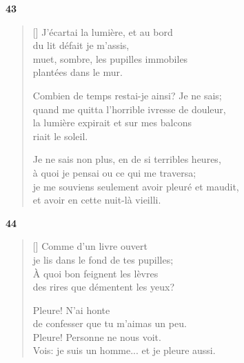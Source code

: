 \documentclass[a4paper,12pt]{book}
\begin{document}
\bigskip

\begin{center}
  \textbf{43}
   \end{center}

\settowidth{\versewidth}{je me souviens seulement avoir pleuré et maudit,}

\begin{verse}[\versewidth]
  J'écartai la lumière, et au bord \\
  du lit défait je m'assis, \\
  muet, sombre, les pupilles immobiles \\
  plantées dans le mur.

  Combien de temps restai-je ainsi? Je ne sais; \\
  quand me quitta l'horrible ivresse de douleur, \\
  la lumière expirait et sur mes balcons \\
  riait le soleil.

  Je ne sais non plus, en de si terribles heures, \\
  à quoi je pensai ou ce qui me traversa; \\
  je me souviens seulement avoir pleuré et maudit, \\
  et avoir en cette nuit-là vieilli.
\end{verse}

\bigskip

\begin{center}
  \textbf{44}
\end{center}

\settowidth{\versewidth}{Vois: je suis un homme... et je pleure aussi!}

\begin{verse}[\versewidth]
  Comme d'un livre ouvert \\
  je lis dans le fond de tes pupilles; \\
  À quoi bon feignent les lèvres \\
  des rires que démentent les yeux?

  Pleure! N'ai honte \\
  de confesser que tu m'aimas un peu. \\
  Pleure! Personne ne nous voit. \\
  Vois: je suis un homme... et je pleure aussi.
\end{verse}
\end{document}
